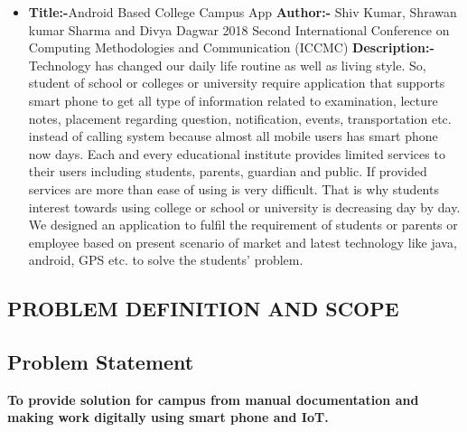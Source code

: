 \documentclass[10pt,a4paper]
{article}
\numberwithin{table}{section}
\begin{document}
{{\begin{normalsize}
\begin{itemize}
\item{\textbf{Title:-}{Android Based College Campus App}\newline
\textbf{Author:-}{ Shiv Kumar, Shrawan kumar Sharma and Divya Dagwar
2018 Second International Conference on Computing Methodologies and Communication (ICCMC)
 } \newline
\textbf{Description:-}{Technology has changed our daily life routine as well as living style. So, student of school or colleges or university require application that supports smart phone to get all type of information related to examination, lecture notes, placement regarding question, notification, events, transportation etc. instead of calling system because almost all mobile users has smart phone now days. Each and every educational institute provides limited services to their users including students, parents, guardian and public. If provided services are more than ease of using is very difficult. That is why students interest towards using college or school or university is decreasing day by day. We designed an application to fulfil the requirement of students or parents or employee based on present scenario of market and latest technology like java, android, GPS etc. to solve the students' problem.}}

\end{itemize}



\newpage
\begin{center}
\begin{huge}
\section{PROBLEM DEFINITION AND SCOPE}
\end{huge}
\end{center}
\subsection{Problem Statement}
\textbf{To provide solution for campus from manual documentation  and  making  work digitally  using smart phone and IoT.}

\end{normalsize}}}
\end{document}
